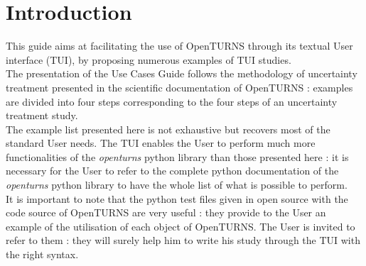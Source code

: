 



\newpage \section*{Introduction}



This guide aims at facilitating the use of OpenTURNS through its textual User interface (TUI), by proposing numerous examples of TUI studies.\\

The presentation of the Use Cases Guide follows the methodology of uncertainty treatment presented in the scientific documentation of OpenTURNS : examples are divided into four steps corresponding to the four steps of an uncertainty treatment study.\\


The example list presented here is not exhaustive but recovers most of the standard User needs. The TUI enables the User to perform much more functionalities of the \emph{openturns} python library than those  presented here : it is necessary for the User to refer to the complete python documentation of the \emph{openturns} python library to have  the whole list of what is possible to perform.\\

It is important to note that the python test files given in open source with the code source of OpenTURNS  are very useful : they provide to the User an example of the utilisation of each object of OpenTURNS. The User is invited to refer to them : they will surely help him to write his study through the TUI with the right syntax.\\








